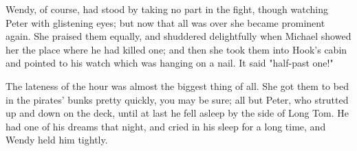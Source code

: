 Wendy, of course, had stood by taking no part in the fight, though
watching Peter with glistening eyes; but now that all was over she became
prominent again. She praised them equally, and shuddered delightfully when
Michael showed her the place where he had killed one; and then she took
them into Hook's cabin and pointed to his watch which was hanging on a
nail. It said "half-past one!"


The lateness of the hour was almost the biggest thing of all. She got them
to bed in the pirates' bunks pretty quickly, you may be sure; all but
Peter, who strutted up and down on the deck, until at last he fell asleep
by the side of Long Tom. He had one of his dreams that night, and cried in
his sleep for a long time, and Wendy held him tightly.

